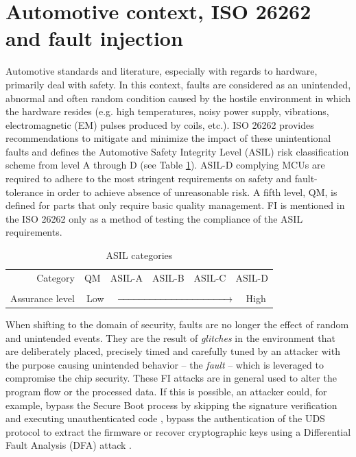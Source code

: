 \documentclass[10pt, conference, compsocconf]{IEEEtran}
\begin{document}
\section{Automotive context, ISO 26262 and fault injection}
Automotive standards and literature, especially with regards to hardware, primarily deal with safety. In this context, faults are considered as an unintended, abnormal and often random condition caused by the hostile environment in which the hardware resides (e.g. high temperatures, noisy power supply, vibrations, electromagnetic (EM) pulses produced by coils, etc.). ISO 26262 provides recommendations to mitigate and minimize the impact of these unintentional faults and defines the Automotive Safety Integrity Level (ASIL) risk classification scheme from level A through D (see Table \ref{tab:ASIL}). ASIL-D complying MCUs are required to adhere to the most stringent requirements on safety and fault-tolerance in order to achieve absence of unreasonable risk. A fifth level, QM, is defined for parts that only require basic quality management. FI is mentioned in the ISO 26262 only as a method of testing the compliance of the ASIL requirements.  

\begin{table}[!t]
    \caption{ASIL categories} 
    \label{tab:ASIL}
    \centering
    \begin{tabular}{rlcccr}
    \toprule
    Category        & QM  & ASIL-A & ASIL-B & ASIL-C & ASIL-D \\
                    & &&&&\\
    Assurance level &   \multicolumn{5}{c}{Low \ \   $\xrightarrow{\hspace*{4cm}}$ \ \ High} \\
    \bottomrule
    \end{tabular}
\end{table}

When shifting to the domain of security, faults are no longer the effect of random and unintended events. They are the result of \emph{glitches} in the environment that are deliberately placed, precisely timed and carefully tuned by an attacker with the purpose causing unintended behavior -- the \emph{fault} -- which is leveraged to compromise the chip security. These FI attacks are in general used to alter the program flow or the processed data. If this is possible, an attacker could, for example, bypass the Secure Boot process by skipping the signature verification and executing unauthenticated code \cite{timmers_controlling_2016}, bypass the authentication of the UDS protocol to extract the firmware or recover cryptographic keys using a Differential Fault Analysis (DFA) attack \cite{biehl_differential_2000,boneh_importance_2001,giraud_dfa_2004}. 
\end{document}
